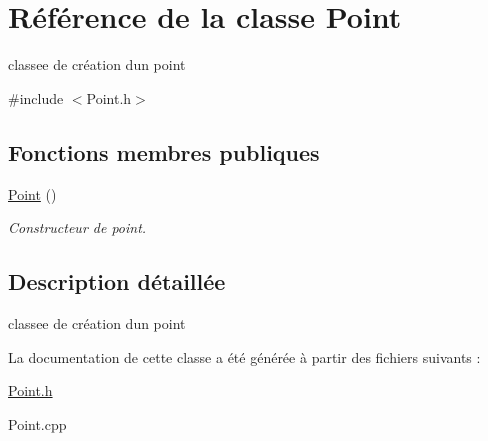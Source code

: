 \hypertarget{class_point}{}\section{Référence de la classe Point}
\label{class_point}


classee de création d\textquotesingle{}un point  




{\ttfamily \#include $<$Point.\+h$>$}

\subsection*{Fonctions membres publiques}
\begin{DoxyCompactItemize}
\item 
\mbox{\label{class_point_ad92f2337b839a94ce97dcdb439b4325a}} 
\hyperlink{class_point_ad92f2337b839a94ce97dcdb439b4325a}{Point} ()
\begin{DoxyCompactList}\small\item\em Constructeur de point. \end{DoxyCompactList}\end{DoxyCompactItemize}


\subsection{Description détaillée}
classee de création d\textquotesingle{}un point 

La documentation de cette classe a été générée à partir des fichiers suivants \+:\begin{DoxyCompactItemize}
\item 
\hyperlink{_point_8h}{Point.\+h}\item 
Point.\+cpp\end{DoxyCompactItemize}
